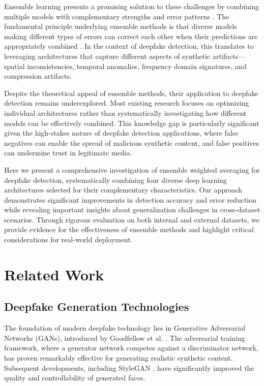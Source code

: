 \documentclass[conference]{IEEEtran}
\begin{document}
Ensemble learning presents a promising solution to these challenges by combining multiple models with complementary strengths and error patterns \cite{dietterich2000ensemble}. The fundamental principle underlying ensemble methods is that diverse models making different types of errors can correct each other when their predictions are appropriately combined \cite{brown2005diversity}. In the context of deepfake detection, this translates to leveraging architectures that capture different aspects of synthetic artifacts—spatial inconsistencies, temporal anomalies, frequency domain signatures, and compression artifacts.

Despite the theoretical appeal of ensemble methods, their application to deepfake detection remains underexplored. Most existing research focuses on optimizing individual architectures rather than systematically investigating how different models can be effectively combined. This knowledge gap is particularly significant given the high-stakes nature of deepfake detection applications, where false negatives can enable the spread of malicious synthetic content, and false positives can undermine trust in legitimate media.

Here we present a comprehensive investigation of ensemble weighted averaging for deepfake detection, systematically combining four diverse deep learning architectures selected for their complementary characteristics. Our approach demonstrates significant improvements in detection accuracy and error reduction while revealing important insights about generalization challenges in cross-dataset scenarios. Through rigorous evaluation on both internal and external datasets, we provide evidence for the effectiveness of ensemble methods and highlight critical considerations for real-world deployment.

\section{Related Work}

\subsection{Deepfake Generation Technologies}

The foundation of modern deepfake technology lies in Generative Adversarial Networks (GANs), introduced by Goodfellow et al. \cite{goodfellow2014generative}. The adversarial training framework, where a generator network competes against a discriminator network, has proven remarkably effective for generating realistic synthetic content. Subsequent developments, including StyleGAN \cite{karras2019style}, have significantly improved the quality and controllability of generated faces.
\end{document}
